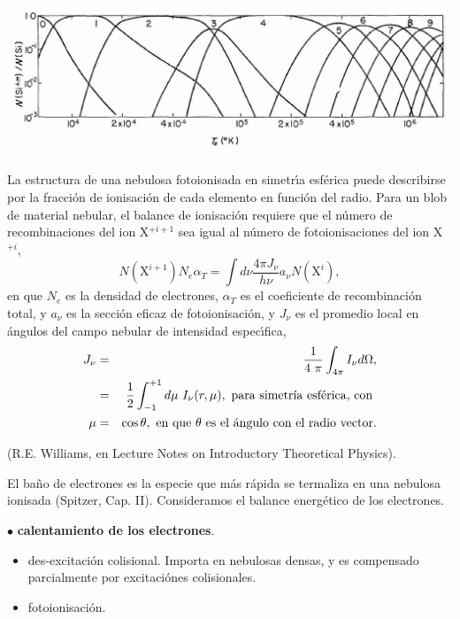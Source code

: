 \begin{center}
  \includegraphics[width=25cm,height=!]{colion_eq.jpg}
\end{center}




La estructura de una nebulosa fotoionisada en simetr\'{\i}a esf\'erica
puede describirse por la fracci\'on de ionisaci\'on de cada elemento
en funci\'on del radio. Para un blob de material nebular, el balance
de ionisaci\'on requiere que el n\'umero de recombinaciones del ion
X$^{+i+1}$ sea igual al n\'umero de fotoionisaciones del ion X$^{+i}$,
\begin{equation}
N(\mathrm{X}^{i+1}) N_{e} \alpha_{T} = {\int}d{\nu} \frac{4\pi J_{\nu}}{h\nu}
a_{\nu} N(\mathrm{X}^{i}), 
\label{eq:ionisation_balance}
\end{equation}
en que $N_{e}$ es la densidad de electrones, $\alpha_{T}$ es el
coeficiente de recombinaci\'on total, y $a_{\nu}$ es la secci\'on
eficaz de fotoionisaci\'on, y $J_{\nu}$ es el promedio local en
\'angulos del campo nebular de intensidad espec\'{\i}fica, 
\begin{eqnarray}
J_{\nu}  & =  & \frac{1}{4~\pi}\int_{4 \pi} I_\nu d\Omega , \nonumber \\
 & = & \frac{1}{2}\int_{-1}^{+1} d\mu ~I_\nu(r,\mu), \text{~para
 simetr\'{\i}a  esf\'erica, con } \nonumber  \\ 
\mu &  =  & \cos \theta, \text{~en que $\theta$ es el \'angulo  con  el radio  vector.} \nonumber 
\end{eqnarray}



(R.E. Williams, en Lecture Notes on Introductory Theoretical
Physics). 

El ba\~no de electrones es la especie que m\'as r\'apida se termaliza
en una nebulosa ionisada (Spitzer, Cap. II). Consideramos el balance
energ\'etico de los electrones.

$\bullet$ {\bf \large calentamiento de los electrones}.
\begin{itemize}
\item des-excitaci\'on colisional. Importa en nebulosas densas, y es
 compensado parcialmente por excitaci\'ones colisionales.
\item fotoionisaci\'on. 
\end{itemize}

